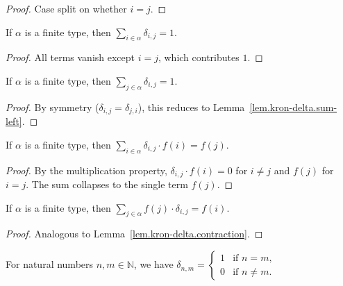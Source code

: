 \begin{proof}
\leanok
Case split on whether $i = j$.
\end{proof}

\begin{lemma}
\label{lem.kron-delta.sum-left}
\leanhelper
\leanok
If $\alpha$ is a finite type, then $\sum_{i \in \alpha} \delta_{i,j} = 1$.
\end{lemma}

\begin{proof}
\leanok
All terms vanish except $i = j$, which contributes $1$.
\end{proof}

\begin{lemma}
\label{lem.kron-delta.sum-right}
\leanhelper
\leanok
If $\alpha$ is a finite type, then $\sum_{j \in \alpha} \delta_{i,j} = 1$.
\end{lemma}

\begin{proof}
\leanok
By symmetry ($\delta_{i,j} = \delta_{j,i}$), this reduces to
Lemma~\ref{lem.kron-delta.sum-left}.
\end{proof}

\begin{lemma}
\label{lem.kron-delta.contraction}
\leanhelper
\leanok
If $\alpha$ is a finite type, then
$\sum_{i \in \alpha} \delta_{i,j} \cdot f(i) = f(j)$.
\end{lemma}

\begin{proof}
\leanok
By the multiplication property, $\delta_{i,j} \cdot f(i) = 0$ for $i \neq j$
and $f(j)$ for $i = j$. The sum collapses to the single term $f(j)$.
\end{proof}

\begin{lemma}
\label{lem.kron-delta.contraction-right}
\leanhelper
\leanok
If $\alpha$ is a finite type, then
$\sum_{j \in \alpha} f(j) \cdot \delta_{i,j} = f(i)$.
\end{lemma}

\begin{proof}
\leanok
Analogous to Lemma~\ref{lem.kron-delta.contraction}.
\end{proof}

\begin{lemma}
\label{lem.kron-delta.nat-eq}
\leanhelper
\leanok
For natural numbers $n,m\in\mathbb{N}$, we have
$\delta_{n,m} = \begin{cases} 1 & \text{if } n = m, \\ 0 & \text{if } n \neq m. \end{cases}$
\end{lemma}

